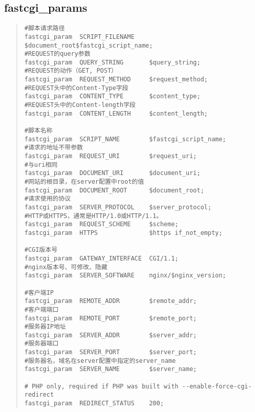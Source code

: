 \documentclass[UTF8]{ctexart}
\newenvironment{myquote}
  {\begin{quote} \kaishu \zihao{-5}}
  {\end{quote}}
\begin{document}
\subsection{fastcgi\_params}
\begin{myquote}
  \begin{verbatim}
#脚本请求路径
fastcgi_param  SCRIPT_FILENAME    $document_root$fastcgi_script_name; 
#REQUEST的query参数
fastcgi_param  QUERY_STRING       $query_string;
#REQUEST的动作（GET, POST）
fastcgi_param  REQUEST_METHOD     $request_method;
#REQUEST头中的Content-Type字段
fastcgi_param  CONTENT_TYPE       $content_type;
#REQUEST头中的Content-length字段
fastcgi_param  CONTENT_LENGTH     $content_length; 

#脚本名称
fastcgi_param  SCRIPT_NAME        $fastcgi_script_name;
#请求的地址不带参数
fastcgi_param  REQUEST_URI        $request_uri;
#与uri相同
fastcgi_param  DOCUMENT_URI       $document_uri;
#网站的根目录，在server配置中root的值
fastcgi_param  DOCUMENT_ROOT      $document_root;
#请求使用的协议
fastcgi_param  SERVER_PROTOCOL    $server_protocol;
#HTTP或HTTPS，通常是HTTP/1.0或HTTP/1.1。
fastcgi_param  REQUEST_SCHEME     $scheme; 
fastcgi_param  HTTPS              $https if_not_empty;

#CGI版本号
fastcgi_param  GATEWAY_INTERFACE  CGI/1.1;
#nginx版本号、可修改、隐藏
fastcgi_param  SERVER_SOFTWARE    nginx/$nginx_version;

#客户端IP
fastcgi_param  REMOTE_ADDR        $remote_addr;
#客户端端口
fastcgi_param  REMOTE_PORT        $remote_port;
#服务器IP地址
fastcgi_param  SERVER_ADDR        $server_addr;
#服务器端口
fastcgi_param  SERVER_PORT        $server_port;
#服务器名，域名在server配置中指定的server_name
fastcgi_param  SERVER_NAME        $server_name;

# PHP only, required if PHP was built with --enable-force-cgi-redirect
fastcgi_param  REDIRECT_STATUS    200;
  \end{verbatim}
\end{myquote}
\end{document}
